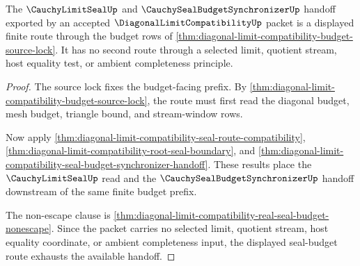 \begin{theorem}
\label{thm:diagonal-limit-compatibility-seal-budget-route}
The $\CauchyLimitSealUp$ and $\CauchySealBudgetSynchronizerUp$ handoff exported by an accepted $\DiagonalLimitCompatibilityUp$ packet is a displayed finite route through the budget rows of \autoref{thm:diagonal-limit-compatibility-budget-source-lock}. It has no second route through a selected limit, quotient stream, host equality test, or ambient completeness principle.
\end{theorem}
\begin{proof}
The source lock fixes the budget-facing prefix. By \autoref{thm:diagonal-limit-compatibility-budget-source-lock}, the route must first read the diagonal budget, mesh budget, triangle bound, and stream-window rows.

Now apply \autoref{thm:diagonal-limit-compatibility-seal-route-compatibility}, \autoref{thm:diagonal-limit-compatibility-root-seal-boundary}, and \autoref{thm:diagonal-limit-compatibility-seal-budget-synchronizer-handoff}. These results place the $\CauchyLimitSealUp$ read and the $\CauchySealBudgetSynchronizerUp$ handoff downstream of the same finite budget prefix.

The non-escape clause is \autoref{thm:diagonal-limit-compatibility-real-seal-budget-nonescape}. Since the packet carries no selected limit, quotient stream, host equality coordinate, or ambient completeness input, the displayed seal-budget route exhausts the available handoff.
\end{proof}

